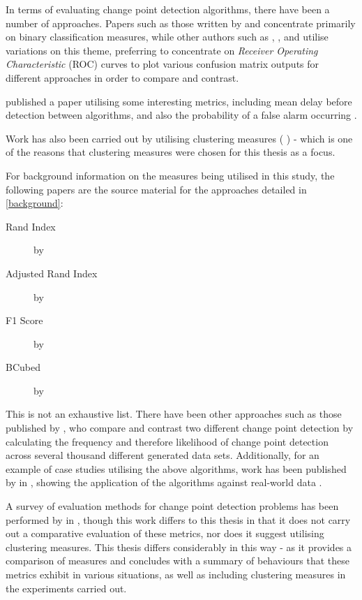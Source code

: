 \documentclass[../main.tex]{subfiles}
\begin{document}
In terms of evaluating change point detection algorithms, there have been a number of approaches. Papers such as those written by \citeauthor{Buntain2014} \cite{Buntain2014} and \citeauthor{Qahtan2015} \cite{Qahtan2015} concentrate primarily on binary classification measures, while other authors such as \citeauthor{Desobry2005} \cite{Desobry2005}, \citeauthor{Fawcett1999} \cite{Fawcett1999}, and \citeauthor{Kawahara2009} \cite{Kawahara2009} utilise variations on this theme, preferring to concentrate on \emph{Receiver Operating Characteristic} (ROC) curves to plot various confusion matrix outputs for different approaches in order to compare and contrast.

\citeauthor{Downey2008} published a paper utilising some interesting metrics, including mean delay before detection between algorithms, and also the probability of a false alarm occurring \cite{Downey2008}.

Work has also been carried out by \citeauthor{Matteson2012} utilising clustering measures ( \cite{Matteson2012}) - which is one of the reasons that clustering measures were chosen for this thesis as a focus.

For background information on the measures being utilised in this study, the following papers are the source material for the approaches detailed in \autoref{background}:

\begin{description}
    \item[Rand Index]  by \citeauthor{Rand1971} \cite{Rand1971}
    \item[Adjusted Rand Index]  by \citeauthor{Hubert1985} \cite{Hubert1985}
    \item[F1 Score]  by \citeauthor{Kent1955} \cite{Kent1955}
    \item[BCubed]  by \citeauthor{Bagga1998} \cite{Bagga1998} 
\end{description}

This is not an exhaustive list. There have been other approaches such as those published by \citeauthor{Madrid2004} \cite{Madrid2004}, who compare and contrast two different change point detection by calculating the frequency and therefore likelihood of change point detection across several thousand different generated data sets. Additionally, for an example of case studies utilising the above algorithms, work has been published by \citeauthor{Killick2014} in , showing the application of the algorithms against real-world data \cite{Killick2014}.

A survey of evaluation methods for change point detection problems has been performed by \citeauthor{Aminikhanghahi} in  \cite{Aminikhanghahi}, though this work differs to this thesis in that it does not carry out a comparative evaluation of these metrics, nor does it suggest utilising clustering measures. This thesis differs considerably in this way - as it provides a comparison of measures and concludes with a summary of behaviours that these metrics exhibit in various situations, as well as including clustering measures in the experiments carried out.
    
\end{document}
